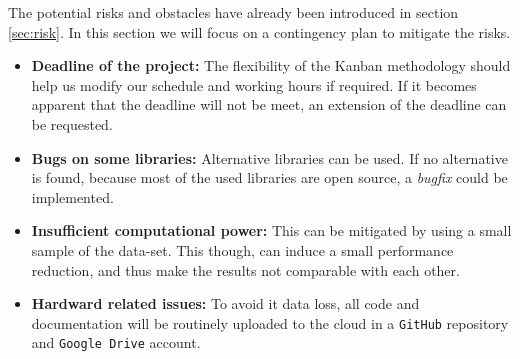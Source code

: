 The potential risks and obstacles have already been introduced in section \ref{sec:risk}. In this section we will focus on a contingency plan to mitigate the risks.

\begin{itemize}
    \item \textbf{Deadline of the project:} The flexibility of the Kanban methodology should help us modify our schedule and working hours if required. If it becomes apparent that the deadline will not be meet, an extension of the deadline can be requested.
    \item \textbf{Bugs on some libraries:} Alternative libraries can be used. If no alternative is found, because most of the used libraries are open source, a \emph{bugfix} could be implemented.
    \item \textbf{Insufficient computational power:} This can be mitigated by using a small sample of the data-set. This though, can induce a small performance reduction, and thus make the results not comparable with each other. 
    \item \textbf{Hardward related issues:} To avoid it data loss, all code and documentation will be routinely uploaded to the cloud in a \texttt{GitHub} repository and \texttt{Google Drive} account.
\end{itemize}



